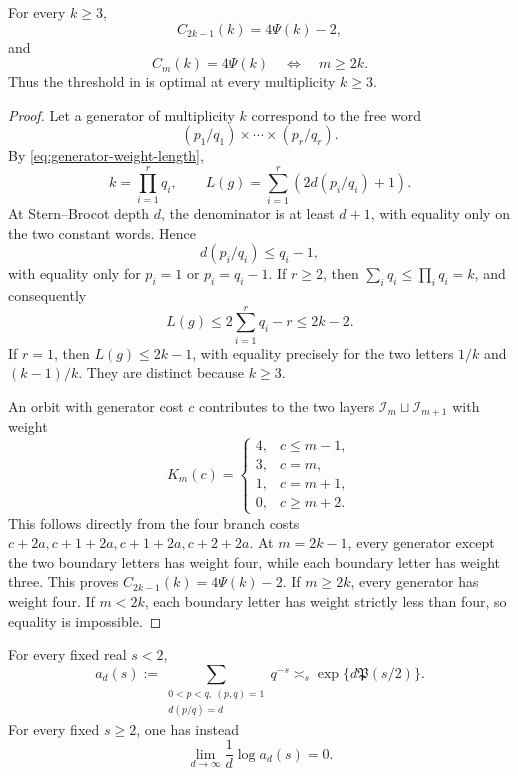 \begin{proposition}
\label{prop:sharp-stabilization-threshold}
For every \(k\ge3\),
\[
 C_{2k-1}(k)=4\Psi(k)-2,
\]
and
\[
 C_m(k)=4\Psi(k)\quad\Longleftrightarrow\quad m\ge2k.
\]
Thus the threshold in  is optimal at every
multiplicity \(k\ge3\).
\end{proposition}

\begin{proof}
Let a generator of multiplicity \(k\) correspond to the free word
\[
 (p_1/q_1)\times\cdots\times(p_r/q_r).
\]
By \eqref{eq:generator-weight-length},
\[
 k=\prod_{i=1}^rq_i,
 \qquad L(g)=\sum_{i=1}^r(2d(p_i/q_i)+1).
\]
At Stern--Brocot depth \(d\), the denominator is at least \(d+1\), with
equality only on the two constant words.  Hence
\[
 d(p_i/q_i)\le q_i-1,
\]
with equality only for \(p_i=1\) or \(p_i=q_i-1\).  If \(r\ge2\), then
\(\sum_iq_i\le\prod_iq_i=k\), and consequently
\[
 L(g)\le2\sum_{i=1}^rq_i-r\le2k-2.
\]
If \(r=1\), then \(L(g)\le2k-1\), with equality precisely for the two
letters \(1/k\) and \((k-1)/k\).  They are distinct because \(k\ge3\).

An orbit with generator cost \(c\) contributes to the two layers
\(\mathcal I_m\sqcup\mathcal I_{m+1}\) with weight
\[
 K_m(c)=
 \begin{cases}
 4,&c\le m-1,\\
 3,&c=m,\\
 1,&c=m+1,\\
 0,&c\ge m+2.
 \end{cases}
\]
This follows directly from the four branch costs
\(c+2a,c+1+2a,c+1+2a,c+2+2a\).  At \(m=2k-1\), every generator except
the two boundary letters has weight four, while each boundary letter has
weight three.  This proves \(C_{2k-1}(k)=4\Psi(k)-2\).  If \(m\ge2k\),
every generator has weight four.  If \(m<2k\), each boundary letter has
weight strictly less than four, so equality is impossible.
\end{proof}

\begin{lemma}
\label{lem:knauf-layer-estimate}
For every fixed real \(s<2\),
\begin{equation}
 a_d(s):=
 \sum_{\substack{0<p<q,\ (p,q)=1\\d(p/q)=d}}q^{-s}
 \asymp_s \exp\{d\mathfrak P(s/2)\}.
 \label{eq:knauf-layer-pressure}
\end{equation}
For every fixed \(s\ge2\), one has instead
\[
 \lim_{d\to\infty}\frac1d\log a_d(s)=0.
\]
\end{lemma}

